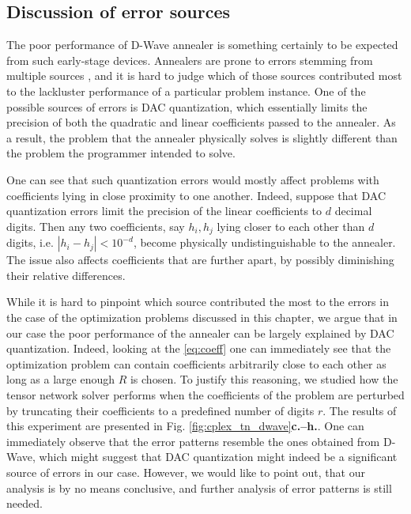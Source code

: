 \subsection{Discussion of error sources}

The poor performance of D-Wave annealer is something certainly to be expected
from such early-stage devices. Annealers are prone to errors stemming from
multiple sources \cite{dwavedocs}, and it is hard to judge which of those
sources contributed most to the lackluster performance of a particular problem
instance. One of the possible sources of errors is DAC quantization, which
essentially limits the precision of both the quadratic and linear coefficients
passed to the annealer. As a result, the problem that the annealer physically
solves is slightly different than the problem the programmer intended to solve.

One can see that such quantization errors would mostly affect problems with
coefficients lying in close proximity to one another. Indeed, suppose that DAC
quantization errors limit the precision of the linear coefficients to $d$
decimal digits. Then any two coefficients, say $h_{i}, h_{{j}}$ lying closer to
each other than $d$ digits, i.e. $|h_{i} - h_{j}| < 10^{-d}$, become physically
undistinguishable to the annealer. The issue also affects coefficients that are
further apart, by possibly diminishing their relative differences.

While it is hard to pinpoint which source contributed the most to the errors in
the case of the optimization problems discussed in this chapter, we argue that
in our case the poor performance of the annealer can be largely explained by
DAC quantization. Indeed, looking at the \eqref{eq:coeff} one can immediately
see that the optimization problem can contain coefficients arbitrarily close to
each other as long as a large enough $R$ is chosen. To justify this reasoning,
we studied how the tensor network solver performs when the coefficients of the
problem are perturbed by truncating their coefficients to a predefined
number of digits $r$. The results of this experiment are presented in Fig.
\ref{fig:cplex_tn_dwave}\textbf{c.--h.}. One can immediately observe that the
error patterns resemble the ones obtained from D-Wave, which might suggest that
DAC quantization might indeed be a significant source of errors in our case.
However, we would like to point out, that our analysis is by no means
conclusive, and further analysis of error patterns is still needed.

